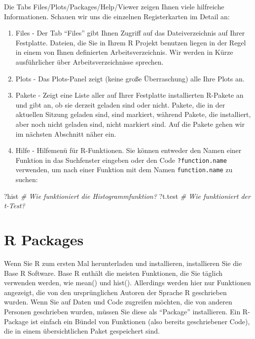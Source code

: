 \documentclass[
]{book}
\newenvironment{Shaded}{\begin{snugshade}}{\end{snugshade}}
\newcommand{\CommentTok}[1]{\textcolor[rgb]{0.56,0.35,0.01}{\textit{#1}}}
\newcommand{\NormalTok}[1]{#1}
\begin{document}
Die Tabs Files/Plots/Packages/Help/Viewer zeigen Ihnen viele hilfreiche Informationen. Schauen wir uns die einzelnen Registerkarten im Detail an:

\begin{enumerate}
\def\labelenumi{\arabic{enumi}.}
\item
  Files - Der Tab ``Files'' gibt Ihnen Zugriff auf das Dateiverzeichnis auf Ihrer Festplatte. Dateien, die Sie in Ihrem R Projekt benutzen liegen in der Regel in einem von Ihnen definierten Arbeitsverzeichnis. Wir werden in Kürze ausführlicher über Arbeitsverzeichnisse sprechen.
\item
  Plots - Das Plots-Panel zeigt (keine große Überraschung) alle Ihre Plots an.
\item
  Pakete - Zeigt eine Liste aller auf Ihrer Festplatte installierten R-Pakete an und gibt an, ob sie derzeit geladen sind oder nicht. Pakete, die in der aktuellen Sitzung geladen sind, sind markiert, während Pakete, die installiert, aber noch nicht geladen sind, nicht markiert sind. Auf die Pakete gehen wir im nächsten Abschnitt näher ein.
\item
  Hilfe - Hilfemenü für R-Funktionen. Sie können entweder den Namen einer Funktion in das Suchfenster eingeben oder den Code \texttt{?function.name} verwenden, um nach einer Funktion mit dem Namen \texttt{function.name} zu suchen:
\end{enumerate}

\begin{Shaded}
\begin{Highlighting}[]
\NormalTok{?hist   }\CommentTok{\# Wie funktioniert die Histogrammfunktion?}
\NormalTok{?t.test }\CommentTok{\# Wie funktioniert der t{-}Test?}
\end{Highlighting}
\end{Shaded}

\hypertarget{r-packages}{%
\section{R Packages}\label{r-packages}}

Wenn Sie R zum ersten Mal herunterladen und installieren, installieren Sie die Base R Software.
Base R enthält die meisten Funktionen, die Sie täglich verwenden werden, wie mean() und hist().
Allerdings werden hier nur Funktionen angezeigt, die von den ursprünglichen Autoren der Sprache R geschrieben wurden.
Wenn Sie auf Daten und Code zugreifen möchten, die von anderen Personen geschrieben wurden, müssen Sie diese als ``Package'' installieren.
Ein R-Package ist einfach ein Bündel von Funktionen (also bereits geschriebener Code), die in einem übersichtlichen Paket gespeichert sind.
\end{document}
